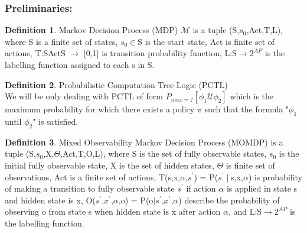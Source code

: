 \documentclass{article}
\theoremstyle{definition}
\newtheorem{definition}{Definition}[section]
\begin{document}
\subsubsection{Preliminaries:}
\theoremstyle{definition}
\begin{definition}{Markov Decision Process (MDP)} $\mathcal{M}$ is a tuple (S,$s_0$,Act,T,L), where S is a finite set of states, $s_0 \in$S is the start state, Act is finite set of actions, T:S\times Act\times S $\rightarrow$ [0,1] is transition probability function, L:S$\rightarrow 2^{AP}$ is the labelling function assigned to each s in S.
\end{definition}
\begin{definition}{Probabilistic Computation Tree Logic (PCTL)}\\
We will be only dealing with PCTL of form $P_{max=?}[\phi_1 \mathcal{U} \phi_2]$ which is the maximum probability for which there exists a policy $\pi$ such that the formula "$\phi_1$ until $\phi_2$" is satisfied.
\end{definition}
\begin{definition}{Mixed Observability Markov Decision Process (MOMDP)} \cite{sahil1}
is a tuple (S,$s_0$,X,$\Theta$,Act,T,O,L), where S is the set of fully observable states, $s_0$ is the initial fully observable state, X is the set of hidden states, $\Theta$ is finite set of observations, Act is a finite set of actions, T(s,x,$\alpha$,$s^{'}$) = P($s^{'}\mid$s,x,$\alpha$) is probability of making a transition to fully observable state $s^{'}$ if action $\alpha$ is applied in state s and hidden state is x, O($s^{'}$,$x^{'}$,$\alpha$,o) = P(o$\mid s^{'}$,$x^{'}$,$\alpha$) describe the probability of observing o from state s when hidden state is x after action $\alpha$, and L:S$\rightarrow 2^{AP}$ is the labelling function.
\end{definition}
\end{document}
